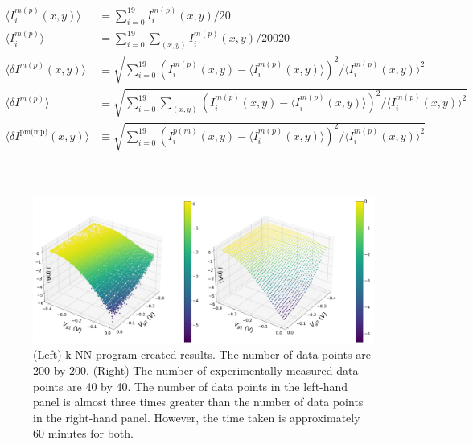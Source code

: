 \documentclass[jkps,preprint,fleqn,showpacs,showkeys]{revtex4}
\begin{document}
	
\begin{align}
    \langle I^{m(p)}_i(x,y) \rangle &= \sum_{i=0}^{19} I^{m(p)}_i(x,y)/20 \\
    \langle I^{m(p)}_i \rangle &= \sum_{i=0}^{19} \sum_{(x,y)} I^{m(p)}_i(x,y)/20020 \\
    \langle\delta I^{m(p)}
    (x,y)\rangle & \equiv \sqrt{\sum_{i=0}^{19}(I^{m(p)}_i(x,y)-\langle I^{m(p)}_i(x,y) \rangle)^2 /\langle I^{m(p)}_i(x,y) \rangle^2}\\
    \langle\delta I^{m(p)}\rangle & \equiv \sqrt{ \sum_{i=0}^{19} \sum_{(x,y)}(I^{m(p)}_i(x,y)-\langle I^{m(p)}_i(x,y) \rangle)^2/\langle I^{m(p)}_i(x,y) \rangle^2}\\
    \langle\delta I^{\text{pm(mp)}}
    (x,y)\rangle & \equiv \sqrt{\sum_{i=0}^{19}(I^{p(m)}_i(x,y)-\langle I^{m(p)}_i(x,y) \rangle)^2 /\langle I^{m(p)}_i(x,y) \rangle^2}\\
\end{align}


\begin{align}
   \label{eq:am-phi}
\end{align}




\begin{equation}
    \label{am}
\end{equation}

\renewcommand{\figurename}{Fig. }
\begin{figure}[b]
\centering
\includegraphics[width=12cm]{Fig_I_Vg}
\parbox{13cm}{\vspace*{0.5cm}
\caption{(Left) k-NN program-created results. The number of data points are 200 by
200. (Right) The number of experimentally measured data points are 40 by 40. 
The number of data points in the left-hand panel is almost three times greater than the number of data points in the right-hand panel. However, the time taken is approximately 60 minutes for both.}
\label{plot1}}
\end{figure}
\end{document}
